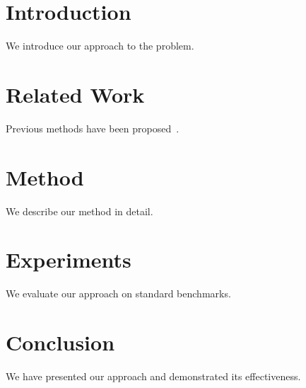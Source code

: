 \documentclass{article}
\begin{document}

\printAffiliationsAndNotice{}

\begin{abstract}
This is a minimal template for ICML 2025 submissions.
Prior work has explored various approaches to this problem~\citep{example2024}.
\end{abstract}

\section{Introduction}
We introduce our approach to the problem.

\section{Related Work}
Previous methods have been proposed~\citep{example2024}.

\section{Method}
We describe our method in detail.

\section{Experiments}
We evaluate our approach on standard benchmarks.

\section{Conclusion}
We have presented our approach and demonstrated its effectiveness.



\end{document}
